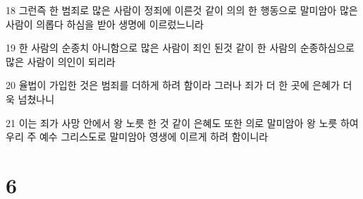 \par 18 그런즉 한 범죄로 많은 사람이 정죄에 이른것 같이 의의 한 행동으로 말미암아 많은 사람이 의롭다 하심을 받아 생명에 이르렀느니라
\par 19 한 사람의 순종치 아니함으로 많은 사람이 죄인 된것 같이 한 사람의 순종하심으로 많은 사람이 의인이 되리라
\par 20 율법이 가입한 것은 범죄를 더하게 하려 함이라 그러나 죄가 더 한 곳에 은혜가 더욱 넘쳤나니
\par 21 이는 죄가 사망 안에서 왕 노릇 한 것 같이 은혜도 또한 의로 말미암아 왕 노릇 하여 우리 주 예수 그리스도로 말미암아 영생에 이르게 하려 함이니라

\chapter{6}

